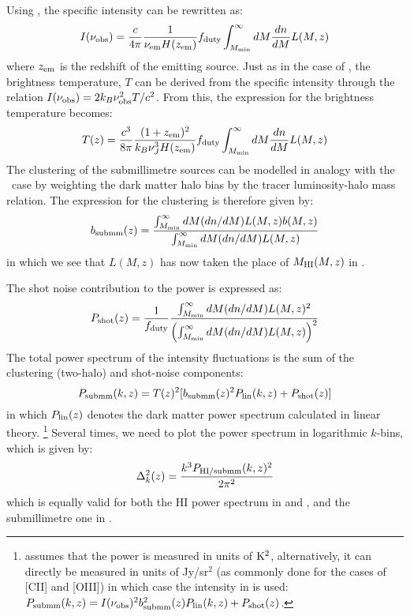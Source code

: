 Using , the specific intensity can be rewritten as:
\begin{equation}
I(\nu_{\rm obs}) = \frac{c}{4 \pi} \frac{1}{\nu_{\rm em} H(z_{\rm em})}  f_{\rm duty} \int_{M_{\rm min}}^{\infty} dM \frac{dn}{dM} L(M,z)
\label{COspint}
\end{equation} 
where $z_{\rm em}$ is the redshift of the emitting source.
Just as in the case of \HI,
the brightness temperature, $T$  can be derived from the specific intensity through the relation $I(\nu_{\rm obs}) = 2 k_B \nu_{\rm obs}^2 T /c^2$. 
From this, the expression for the brightness temperature becomes:
\begin{equation}
T(z) = \frac{c^3}{8 \pi}\frac{(1 + z_{\rm em})^2}{k_B \nu_J^3 H(z_{\rm em})} f_{\rm duty} \int_{M_{\rm min}}^{\infty} dM \frac{dn}{dM} L(M,z)
\label{tco}
\end{equation} 
The clustering of the submillimetre sources  can be modelled in analogy with the \HI\ case by weighting the dark matter halo bias by the tracer luminosity-halo mass relation.
The expression for the clustering is therefore given by:
\begin{equation}
 b_{\rm submm}(z) = \frac{\int_{M_{\rm min}}^{\infty} dM (dn/dM) L (M,z) b(M,z)}{\int_{M_{\rm min}}^{\infty} dM (dn/dM) L (M,z)}
\end{equation} 
in which we see that $L(M,z)$ has now taken the place of $M_{\rm HI}(M,z)$ in .

The shot noise contribution to the power is expressed as:
\begin{equation}
 P_{\rm shot}(z) = \frac{1}{f_{\rm duty}}\frac{\int_{M_{\rm min}}^{\infty} dM (dn/dM) L (M,z)^2}{\left(\int_{M_{\rm min}}^{\infty} dM (dn/dM) L (M,z)\right)^2}
\end{equation} 
The total power spectrum of the intensity fluctuations is the sum of the clustering (two-halo) and shot-noise components:
\begin{equation}
 P_{\rm submm}(k,z) =  T (z)^2 [b_{\rm submm}(z)^2 P_{\rm lin}(k,z) + P_{\rm shot}(z)]
 \label{submmpower}
\end{equation} 
in which $P_{\rm lin}(z)$ denotes the dark matter power spectrum calculated in linear theory. \footnote{ assumes that the power is measured in units of ${\rm K}^2$, alternatively, it can directly be measured in units of Jy/sr$^2$ (as commonly done for the cases of [CII] and [OIII]) in which case the intensity in  is  used: $P_{\rm submm}(k,z) = I(\nu_{\rm obs})^2 b_{\rm submm}^2(z) P_{\rm lin}(k,z) + P_{\rm shot}(z)$.}
Several times,  we need to plot the power spectrum in logarithmic $k$-bins, which is given by:
\begin{equation}
 \Delta_{k}^2(z) = \frac{k^3  P_{\rm HI/submm}(k,z)^2}{2 \pi^2}
 \label{COpowspeclog}
\end{equation} 
 which is equally valid for both the HI power spectrum in  and , and the submillimetre one in .
 
